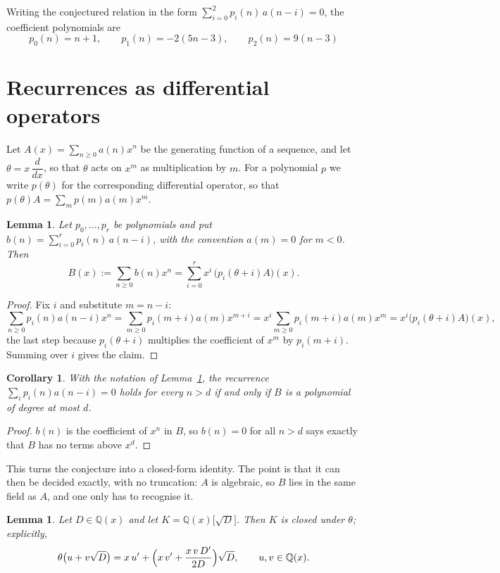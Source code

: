 \documentclass[11pt,a4paper]{article}
\theoremstyle{plain}
\newtheorem{lemma}[theorem]{Lemma}
\newtheorem{corollary}[theorem]{Corollary}
\theoremstyle{definition}
\begin{document}
Writing the conjectured relation in the form $\sum_{i=0}^{2}p_{i}(n)\,a(n-i)=0$,
the coefficient polynomials are
\[
p_{0}(n)=n + 1,\qquad p_{1}(n)=- 2 \left(5 n - 3\right),\qquad p_{2}(n)=9 \left(n - 3\right)
\]

\section{Recurrences as differential operators}

Let $A(x)=\sum_{n\ge0}a(n)x^{n}$ be the generating function of a sequence, and let
$\theta=x\,\dfrac{d}{dx}$, so that $\theta$ acts on $x^{m}$ as multiplication by $m$. For a
polynomial $p$ we write $p(\theta)$ for the corresponding differential operator, so that
$p(\theta)A=\sum_{m}p(m)a(m)x^{m}$.

\begin{lemma}\label{lem:transfer}
Let $p_{0},\dots,p_{r}$ be polynomials and put $b(n)=\sum_{i=0}^{r}p_{i}(n)\,a(n-i)$, with
the convention $a(m)=0$ for $m<0$. Then
\[
B(x):=\sum_{n\ge0}b(n)x^{n}=\sum_{i=0}^{r}x^{i}\,\bigl(p_{i}(\theta+i)A\bigr)(x).
\]
\end{lemma}

\begin{proof}
Fix $i$ and substitute $m=n-i$:
\[
\sum_{n\ge0}p_{i}(n)a(n-i)x^{n}=\sum_{m\ge0}p_{i}(m+i)a(m)x^{m+i}
=x^{i}\sum_{m\ge0}p_{i}(m+i)a(m)x^{m}=x^{i}\bigl(p_{i}(\theta+i)A\bigr)(x),
\]
the last step because $p_{i}(\theta+i)$ multiplies the coefficient of $x^{m}$ by
$p_{i}(m+i)$. Summing over $i$ gives the claim.
\end{proof}

\begin{corollary}\label{cor:criterion}
With the notation of Lemma~\ref{lem:transfer}, the recurrence
$\sum_{i}p_{i}(n)a(n-i)=0$ holds for every $n>d$ if and only if $B$ is a polynomial of
degree at most $d$.
\end{corollary}

\begin{proof}
$b(n)$ is the coefficient of $x^{n}$ in $B$, so $b(n)=0$ for all $n>d$ says exactly that
$B$ has no terms above $x^{d}$.
\end{proof}

This turns the conjecture into a closed-form identity. The point is that it can then be
decided exactly, with no truncation: $A$ is algebraic, so $B$ lies in the same field as
$A$, and one only has to recognise it.

\begin{lemma}\label{lem:field}
Let $D\in\mathbb{Q}(x)$ and let $K=\mathbb{Q}(x)\bigl[\sqrt{D}\bigr]$. Then $K$ is closed
under $\theta$; explicitly,
\[
\theta\bigl(u+v\sqrt{D}\bigr)=x\,u'+\Bigl(x\,v'+\frac{x\,v\,D'}{2D}\Bigr)\sqrt{D},
\qquad u,v\in\mathbb{Q}(x).
\]
\end{lemma}
\end{document}
